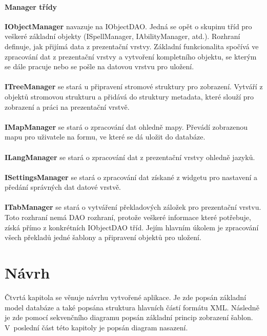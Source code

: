 \documentclass[thesis=B,czech]{resources/FITthesis}[2012/06/26]
\begin{document}
\subsubsection*{Manager třídy}
\textbf{IObjectManager} navazuje na IObjectDAO. Jedná se opět o skupinu tříd pro veškeré základní objekty (ISpellManager, IAbilityManager, atd.). Rozhraní definuje, jak přijímá data z prezentační vrstvy. Základní funkcionalita spočívá ve zpracování dat z prezentační vrstvy a vytvoření kompletního objektu, se kterým se dále pracuje nebo se pošle na datovou vrstvu pro uložení.\\
\\
\noindent\textbf{ITreeManager} se stará u připravení stromové struktury pro zobrazení. Vytváří z objektů stromovou strukturu a přidává do struktury metadata, které slouží pro zobrazení a práci na prezentační vrstvě.\\
\\
\textbf{IMapManager} se stará o zpracování dat ohledně mapy. Převádí zobrazenou mapu pro uživatele na formu, ve které se dá uložit do databáze. \\
\\
\textbf{ILangManager} se stará o zpracování dat z prezentační vrstvy ohledně jazyků.\\
\\
\textbf{ISettingsManager} se stará o zpracování dat získané z widgetu pro nastavení a předání správných dat datové vrstvě.\\
\\
\textbf{ITabManager} se stará o vytváření překladových záložek pro prezentační vrstvu. Toto rozhraní nemá DAO rozhraní, protože veškeré informace které potřebuje, získá přímo z konkrétních IObjectDAO tříd. Jejím hlavním úkolem je zpracování všech překladů jedné šablony a připravení objektů pro uložení.\\





\chapter{Návrh}
Čtvrtá kapitola se věnuje návrhu vytvořené aplikace. Je zde popsán základní model databáze a také popsána struktura hlavních částí formátu XML. Následně je zde pomocí sekvenčního diagramu popsán základní princip zobrazení šablon. V~poslední část této kapitoly je popsán diagram nasazení. 
\end{document}
